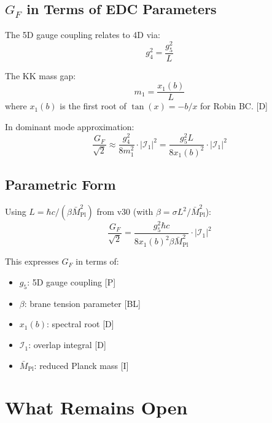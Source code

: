 \documentclass[11pt,a4paper]{article}
\newcommand{\Mpl}{\bar{M}_{\mathrm{Pl}}}
\begin{document}
\subsection{$G_F$ in Terms of EDC Parameters}

The 5D gauge coupling relates to 4D via:
\begin{equation}
g_4^2 = \frac{g_5^2}{L}
\label{eq:g4-g5}
\end{equation}

The KK mass gap:
\begin{equation}
m_1 = \frac{x_1(b)}{L}
\label{eq:m1-gap}
\end{equation}
where $x_1(b)$ is the first root of $\tan(x) = -b/x$ for Robin BC. [D]

In dominant mode approximation:
\begin{equation}
\frac{G_F}{\sqrt{2}} \approx \frac{g_4^2}{8m_1^2} \cdot |\mathcal{I}_1|^2
= \frac{g_5^2 L}{8 x_1(b)^2} \cdot |\mathcal{I}_1|^2
\label{eq:gf-edc}
\end{equation}

\subsection{Parametric Form}

Using $L = \hbar c/(\beta \Mpl^2)$ from v30 (with $\beta = \sigma L^2/\Mpl^2$):
\begin{equation}
\frac{G_F}{\sqrt{2}} = \frac{g_5^2 \hbar c}{8 x_1(b)^2 \beta \Mpl^2} \cdot |\mathcal{I}_1|^2
\label{eq:gf-parametric}
\end{equation}

This expresses $G_F$ in terms of:
\begin{itemize}
\item $g_5$: 5D gauge coupling [P]
\item $\beta$: brane tension parameter [BL]
\item $x_1(b)$: spectral root [D]
\item $\mathcal{I}_1$: overlap integral [D]
\item $\Mpl$: reduced Planck mass [I]
\end{itemize}

\section{What Remains Open}
\label{sec:open}
\end{document}
